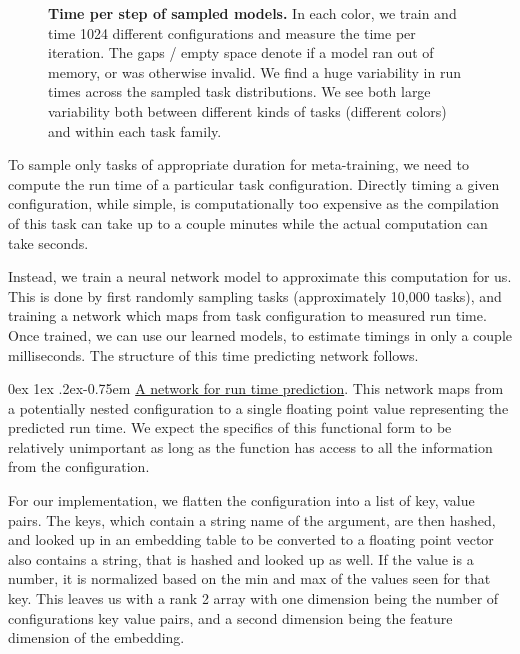 \documentclass[11pt]{article}
\makeatletter
\renewcommand{\paragraph}{%
  \@startsection{paragraph}{4}%
  {\z@}{0ex \@plus 1ex \@minus .2ex}{-0.75em}%
  {\normalfont\normalsize\bfseries}%
}
\makeatother
\begin{document}
\begin{figure}
    \centering
    \caption{\textbf{Time per step of sampled models.} In each color, we train and time 1024 different configurations and measure the time per iteration.
    The gaps / empty space denote if a model ran out of memory, or was otherwise invalid. We find a huge variability in run times across the sampled task distributions. We see both large variability both between different kinds of tasks (different colors) and within each task family.
    \label{fig:filter_times}
    }
\end{figure}



To sample only tasks of appropriate duration for meta-training, we need to compute the run time of a particular task configuration.
Directly timing a given configuration, while simple, is computationally too expensive as the compilation of this task can take up to a couple minutes while the actual computation can take seconds.

Instead, we train a neural network model to approximate this computation for us.
This is done by first randomly sampling tasks (approximately 10,000 tasks), and training a network which maps from task configuration to measured run time. Once trained, we can use our learned models, to estimate timings in only a couple milliseconds. The structure of this time predicting network follows.

\paragraph{\href{https://github.com/google/learned_optimization/blob/4447601601f04e3dc7b1aecd7854d44526593752/learned_optimization/time_filter/time_model.py}{A network for run time prediction}.}
This network maps from a potentially nested configuration to a single floating point value representing the predicted run time.
We expect the specifics of this functional form to be relatively unimportant as long as the function has access to all the information from the configuration.

For our implementation, we flatten the configuration into a list of key, value pairs.
The keys, which contain a string name of the argument, are then hashed, and looked up in an embedding table to be converted to a floating point vector also contains a string, that is hashed and looked up as well.
If the value is a number, it is normalized based on the min and max of the values seen for that key.
This leaves us with a rank 2 array with one dimension being the number of configurations key value pairs, and a second dimension being the feature dimension of the embedding.
\end{document}
